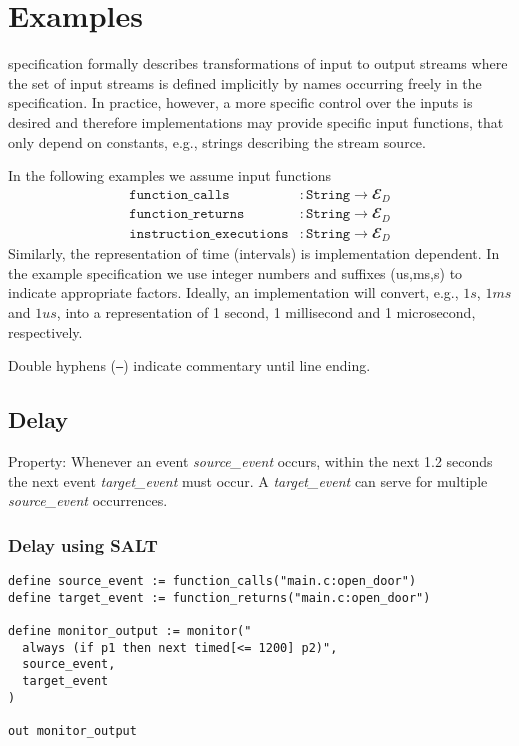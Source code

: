 \section{Examples}

\tessla specification formally describes transformations of input to output streams where the set of input streams is defined implicitly by names occurring freely in the specification. 
In practice, however, a more specific control over the inputs is desired and therefore implementations may provide specific input functions, that only depend on constants, e.g., strings describing the stream source.

In the following examples we assume input functions
\begin{align*}
 \mathtt{function\_calls}&: \mathtt{String} → 𝓔_D\\
 \mathtt{function\_returns}&: \mathtt{String} → 𝓔_D\\
\mathtt{instruction\_executions}&:\mathtt{String} → 𝓔_D
\end{align*}
Similarly, the representation of time (intervals) is implementation dependent.
In the example specification we use integer numbers and suffixes (us,ms,s) to indicate appropriate factors. 
Ideally, an implementation will convert, e.g.,  $1s$, $1ms$ and $1us$, into a representation of 1 second, 1 millisecond and 1 microsecond, respectively.

Double hyphens (\texttt{--}) indicate commentary until line ending.

\subsection{Delay}

Property: Whenever an event \emph{source\_event} occurs, within the next 1.2 seconds the next event \emph{target\_event} must occur.
A \emph{target\_event} can serve for multiple \emph{source\_event} occurrences.

\subsubsection{Delay using SALT}

\begin{lstlisting}[language=tessla+salt]
define source_event := function_calls("main.c:open_door")
define target_event := function_returns("main.c:open_door")

define monitor_output := monitor("
  always (if p1 then next timed[<= 1200] p2)",
  source_event,
  target_event
)

out monitor_output
\end{lstlisting}

